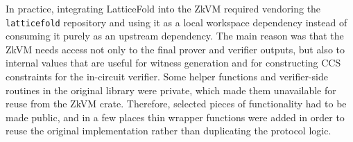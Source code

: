 In practice, integrating LatticeFold into the ZkVM required vendoring the
\texttt{latticefold} repository and using it as a local workspace dependency
instead of consuming it purely as an upstream dependency. The main reason
was that the ZkVM needs access not only to the final prover and verifier outputs,
but also to internal values that are useful for witness generation and for
constructing CCS constraints for the in-circuit verifier. Some helper functions
and verifier-side routines in the original library were private, which made them
unavailable for reuse from the ZkVM crate. Therefore, selected pieces of
functionality had to be made public, and in a few places thin wrapper functions
were added in order to reuse the original implementation rather than duplicating
the protocol logic.

